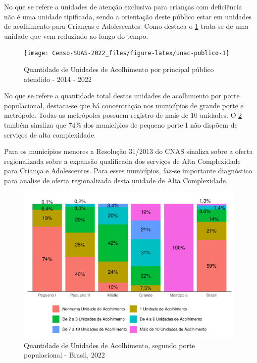 \documentclass[
  brazilian]{report}
\begin{document}
No que se refere a unidades de atenção exclusiva para crianças com
deficiência não é uma unidade tipificada, sendo a orientação deste
público estar em unidades de acolhimento para Crianças e Adolescentes.
Como destaca o \cref{fig:unac-publico} trata-se de uma unidade que vem
reduzindo ao longo do tempo.

\begin{figure}
\texttt{[image: Censo-SUAS-2022\_files/figure-latex/unac-publico-1]} \caption[Quantidade de Unidades de Acolhimento por principal público atendido  - 2014 - 2022]{Quantidade de Unidades de Acolhimento por principal público atendido  - 2014 - 2022}\label{fig:unac-publico}
\end{figure}

No que se refere a quantidade total destas unidades de acolhimento por
porte populacional, destaca-se que há concentração nos municípios de
grande porte e metrópole. Todas as metrópoles possuem registro de mais
de 10 unidades. O \cref{fig:unac-porte} também sinaliza que 74\% dos
municípios de pequeno porte I não dispõem de serviços de alta
complexidade.

Para os municípios menores a Resolução 31/2013 do CNAS sinaliza sobre a
oferta regionalizada sobre a expansão qualificada dos serviços de Alta
Complexidade para Criança e Adolescentes. Para esses municípios, faz-se
importante diagnóstico para analise de oferta regionalizada desta
unidade de Alta Complexidade.

\begin{figure}
\includegraphics{Censo-SUAS-2022_files/figure-latex/unac-porte-1} \caption[Quantidade de Unidades de Acolhimento, segundo porte populacional - Brasil, 2022]{Quantidade de Unidades de Acolhimento, segundo porte populacional - Brasil, 2022}\label{fig:unac-porte}
\end{figure}
\end{document}

